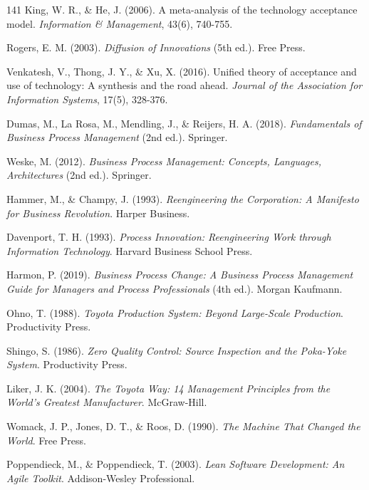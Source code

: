\begin{thebibliography}{141}
King, W. R., \& He, J. (2006). A meta-analysis of the technology acceptance model. \textit{Information \& Management}, 43(6), 740-755.

Rogers, E. M. (2003). \textit{Diffusion of Innovations} (5th ed.). Free Press.

Venkatesh, V., Thong, J. Y., \& Xu, X. (2016). Unified theory of acceptance and use of technology: A synthesis and the road ahead. \textit{Journal of the Association for Information Systems}, 17(5), 328-376.


Dumas, M., La Rosa, M., Mendling, J., \& Reijers, H. A. (2018). \textit{Fundamentals of Business Process Management} (2nd ed.). Springer.

Weske, M. (2012). \textit{Business Process Management: Concepts, Languages, Architectures} (2nd ed.). Springer.

Hammer, M., \& Champy, J. (1993). \textit{Reengineering the Corporation: A Manifesto for Business Revolution}. Harper Business.

Davenport, T. H. (1993). \textit{Process Innovation: Reengineering Work through Information Technology}. Harvard Business School Press.

Harmon, P. (2019). \textit{Business Process Change: A Business Process Management Guide for Managers and Process Professionals} (4th ed.). Morgan Kaufmann.


Ohno, T. (1988). \textit{Toyota Production System: Beyond Large-Scale Production}. Productivity Press.

Shingo, S. (1986). \textit{Zero Quality Control: Source Inspection and the Poka-Yoke System}. Productivity Press.

Liker, J. K. (2004). \textit{The Toyota Way: 14 Management Principles from the World's Greatest Manufacturer}. McGraw-Hill.

Womack, J. P., Jones, D. T., \& Roos, D. (1990). \textit{The Machine That Changed the World}. Free Press.

Poppendieck, M., \& Poppendieck, T. (2003). \textit{Lean Software Development: An Agile Toolkit}. Addison-Wesley Professional.


\end{thebibliography}
